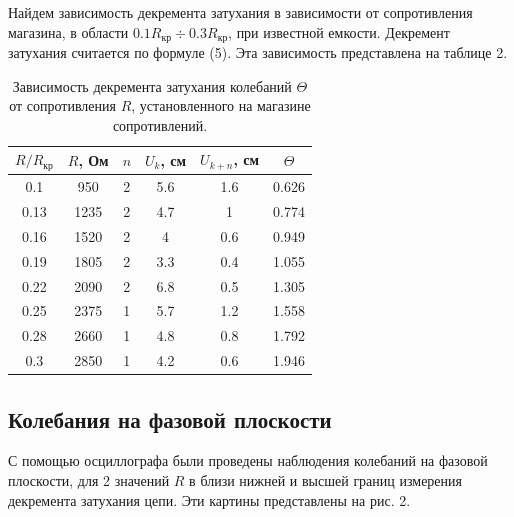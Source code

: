 \documentclass[a4paper, 14pt]{extarticle}%
\newcommand\ECaption[1]{%
     \captionsetup{font=footnotesize}%
     \caption{#1}}
\begin{document}
Найдем зависимость декремента затухания в зависимости от сопротивления магазина, в области $0.1R_{\text{кр}}\div0.3R_{\text{кр}}$, при известной емкости. Декремент затухания считается по формуле (5). Эта зависимость представлена на таблице 2.

\begin{table}[h!]
\begin{center}
\begin{tabular}{|c|c|c|c|c|c|}
\hline
\rowcolor[HTML]{9698ED} 
$R/R_{\text{кр}}$ & $R$, Ом & $n$ & $U_k$, см & $U_{k+n}$, см & $\Theta$ \\ \hline
0.1              & 950  & 2   & 5.6   & 1.6       & 0.626    \\ \hline
\rowcolor[HTML]{9698ED} 
0.13             & 1235 & 2   & 4.7   & 1         & 0.774    \\ \hline
0.16             & 1520 & 2   & 4     & 0.6       & 0.949    \\ \hline
\rowcolor[HTML]{9698ED} 
0.19             & 1805 & 2   & 3.3   & 0.4       & 1.055    \\ \hline
0.22             & 2090 & 2   & 6.8   & 0.5       & 1.305    \\ \hline
\rowcolor[HTML]{9698ED} 
0.25             & 2375 & 1   & 5.7   & 1.2       & 1.558    \\ \hline
0.28             & 2660 & 1   & 4.8   & 0.8       & 1.792    \\ \hline
\rowcolor[HTML]{9698ED} 
0.3              & 2850 & 1   & 4.2   & 0.6       & 1.946    \\ \hline
\end{tabular}
\ECaption{Зависимость декремента затухания колебаний $\Theta$ от сопротивления $R$, установленного на магазине сопротивлений.}
\end{center}
\end{table}

\subsection*{Колебания на фазовой плоскости}
С помощью осциллографа были проведены наблюдения колебаний на фазовой плоскости, для 2 значений $R$ в близи нижней и высшей границ измерения декремента затухания цепи. Эти картины представлены на рис. 2.

\end{document}
